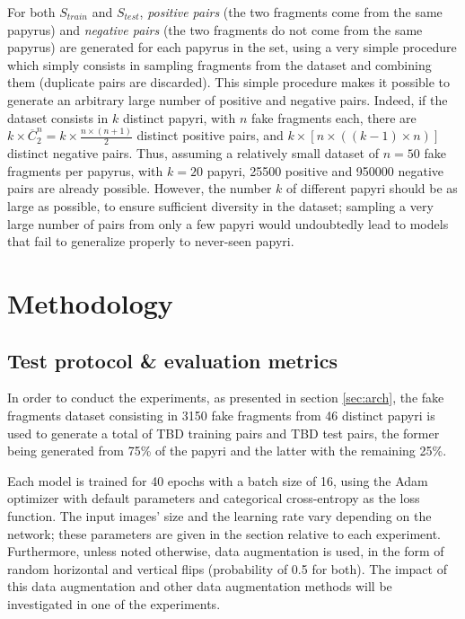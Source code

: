 \documentclass[11pt]{report}
\newcommand\xfrag{3150 }
\newcommand\xpapy{46 }
\begin{document}
For both $S_{train}$ and $S_{test}$, \emph{positive pairs} (the two fragments come from the same papyrus) and \emph{negative pairs} (the two fragments do not come from the same papyrus) are generated for each papyrus in the set, using a very simple procedure which simply consists in sampling fragments from the dataset and combining them (duplicate pairs are discarded).\newline
This simple procedure makes it possible to generate an arbitrary large number of positive and negative pairs. Indeed, if the dataset consists in $k$ distinct papyri, with $n$ fake fragments each, there are $k \times \overline{C}_{2}^{n} = k \times \frac{n \times (n+1)}{2}$ distinct positive pairs, and $k \times [n \times ((k - 1) \times n)]$ distinct negative pairs. Thus, assuming a relatively small dataset of $n = 50$ fake fragments per papyrus, with $k = 20$ papyri, 25500 positive and 950000 negative pairs are already possible.\newline
However, the number $k$ of different papyri should be as large as possible, to ensure sufficient diversity in the dataset; sampling a very large number of pairs from only a few papyri would undoubtedly lead to models that fail to generalize properly to never-seen papyri.\newline


\chapter{Methodology}

\section{Test protocol \& evaluation metrics}

In order to conduct the experiments, as presented in section \ref{sec:arch}, the fake fragments dataset consisting in \xfrag fake fragments from \xpapy distinct papyri is used to generate a total of TBD training pairs and TBD test pairs, the former being generated from 75\% of the papyri and the latter with the remaining 25\%.\newline

Each model is trained for 40 epochs with a batch size of 16, using the Adam optimizer with default parameters and categorical cross-entropy as the loss function. The input images' size and the learning rate vary depending on the network; these parameters are given in the section relative to each experiment. Furthermore, unless noted otherwise, data augmentation is used, in the form of random horizontal and vertical flips (probability of 0.5 for both). The impact of this data augmentation and other data augmentation methods will be investigated in one of the experiments.\newline
\end{document}
